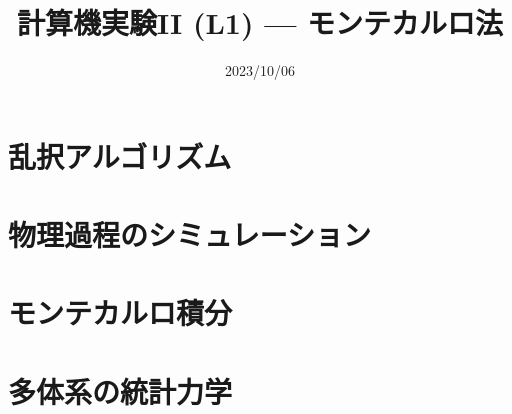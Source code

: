 \documentclass[10pt,dvipdfmx]{beamer}
\title{計算機実験II (L1) --- モンテカルロ法}
\date{2023/10/06}
\begin{document}
\begin{frame}
  \titlepage
  \tableofcontents
\end{frame}


% 

\section{乱択アルゴリズム}






\section{物理過程のシミュレーション}






\section{モンテカルロ積分}












\section{多体系の統計力学}
\end{document}
